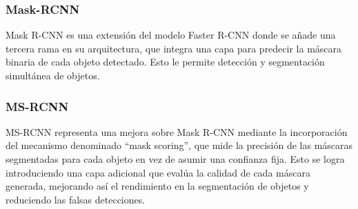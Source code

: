 \subsubsection{Mask-RCNN}
Mask R-CNN \cite{MaskRCNN} es una extensión del modelo Faster R-CNN \cite{FasterRCNN} donde se añade una tercera rama en su arquitectura, que integra una capa para predecir la máscara binaria de cada objeto detectado. Esto le permite detección y segmentación simultánea de objetos. 

\subsubsection{MS-RCNN}
MS-RCNN \cite{MaskScoringRCNN} representa una mejora sobre Mask R-CNN mediante la incorporación del mecanismo denominado ``mask scoring'', que mide la precisión de las máscaras segmentadas para cada objeto en vez de asumir una confianza fija. Esto se logra introduciendo una capa adicional que evalúa la calidad de cada máscara generada, mejorando así el rendimiento en la segmentación de objetos y reduciendo las falsas detecciones.


